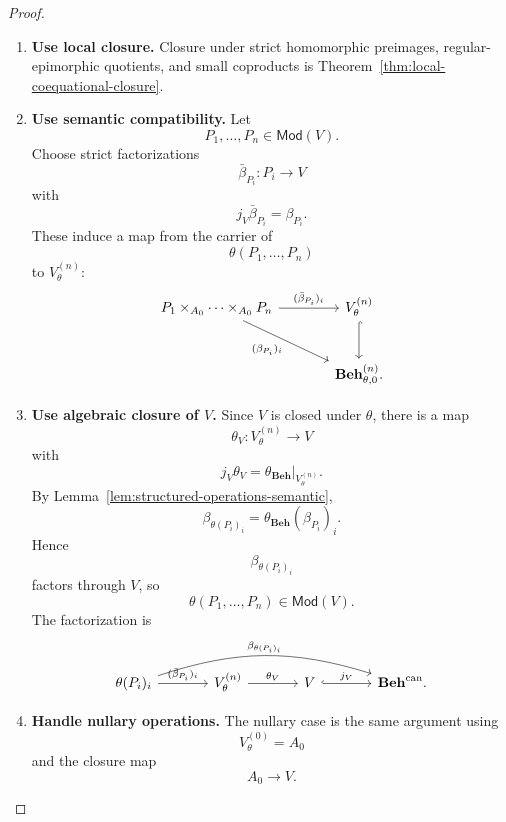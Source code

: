 \begin{proof}
    \leavevmode
    \begin{enumerate}
        \item \textbf{Use local closure.}
        Closure under strict homomorphic preimages, regular-epimorphic
        quotients, and small coproducts is
        Theorem~\ref{thm:local-coequational-closure}.

        \item \textbf{Use semantic compatibility.}
        Let
        \[
            P_1,\dots,P_n\in\mathsf{Mod}(V).
        \]
        Choose strict factorizations
        \[
            \bar\beta_{P_i}:P_i\to V
        \]
        with
        \[
            j_V\bar\beta_{P_i}=\beta_{P_i}.
        \]
        These induce a map from the carrier of
        \[
            \theta(P_1,\dots,P_n)
        \]
        to \(V^{(n)}_\theta\):
        \[
        \begin{tikzcd}[column sep=large, row sep=large]
            P_1\times_{A_0}\cdots\times_{A_0}P_n
                \arrow[r, "{(\bar\beta_{P_i})_i}"]
                \arrow[dr, "{(\beta_{P_i})_i}"']
            &
            V^{(n)}_\theta
                \arrow[d, hook]
            \\
            &
            \mathbf{Beh}^{(n)}_{\theta,0}.
        \end{tikzcd}
        \]

        \item \textbf{Use algebraic closure of \(V\).}
        Since \(V\) is closed under \(\theta\), there is a map
        \[
            \theta_V:V^{(n)}_\theta\to V
        \]
        with
        \[
            j_V\theta_V
            =
            \theta_{\mathbf{Beh}}\big|_{V^{(n)}_\theta}.
        \]
        By Lemma~\ref{lem:structured-operations-semantic},
        \[
            \beta_{\theta(P_i)_i}
            =
            \theta_{\mathbf{Beh}}(\beta_{P_i})_i.
        \]
        Hence
        \[
            \beta_{\theta(P_i)_i}
        \]
        factors through \(V\), so
        \[
            \theta(P_1,\dots,P_n)\in\mathsf{Mod}(V).
        \]
        The factorization is
        \[
        \begin{tikzcd}[column sep=large, row sep=large]
            \theta(P_i)_i
                \arrow[r, "{(\bar\beta_{P_i})_i}"]
                \arrow[rrr, bend left=18, "\beta_{\theta(P_i)_i}"]
            &
            V^{(n)}_\theta
                \arrow[r, "\theta_V"]
            &
            V
                \arrow[r, hook, "j_V"]
            &
            \mathbf{Beh}^{\mathrm{can}} .
        \end{tikzcd}
        \]

        \item \textbf{Handle nullary operations.}
        The nullary case is the same argument using
        \[
            V^{(0)}_\theta=A_0
        \]
        and the closure map
        \[
            A_0\to V.
        \]
    \end{enumerate}
\end{proof}

